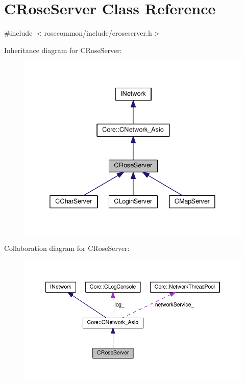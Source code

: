 \hypertarget{classCRoseServer}{}\section{C\+Rose\+Server Class Reference}
\label{classCRoseServer}


{\ttfamily \#include $<$rosecommon/include/croseserver.\+h$>$}



Inheritance diagram for C\+Rose\+Server\+:
\nopagebreak
\begin{figure}[H]
\begin{center}
\leavevmode
\includegraphics[width=338pt]{classCRoseServer__inherit__graph}
\end{center}
\end{figure}


Collaboration diagram for C\+Rose\+Server\+:
\nopagebreak
\begin{figure}[H]
\begin{center}
\leavevmode
\includegraphics[width=350pt]{classCRoseServer__coll__graph}
\end{center}
\end{figure}
